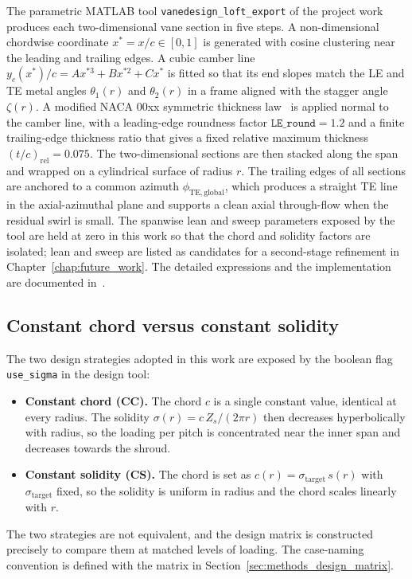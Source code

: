 The parametric MATLAB tool \texttt{vanedesign\_loft\_export} of the project work~\cite{Leonsen2025} produces each two-dimensional vane section in five steps. A non-dimensional chordwise coordinate $x^*=x/c\in[0,1]$ is generated with cosine clustering near the leading and trailing edges. A cubic camber line $y_c(x^*)/c = A x^{*3} + B x^{*2} + C x^*$ is fitted so that its end slopes match the LE and TE metal angles $\theta_1(r)$ and $\theta_2(r)$ in a frame aligned with the stagger angle $\zeta(r)$. A modified NACA 00xx symmetric thickness law~\cite{Abbott1959} is applied normal to the camber line, with a leading-edge roundness factor $\texttt{LE\_round}=1.2$ and a finite trailing-edge thickness ratio that gives a fixed relative maximum thickness $(t/c)_{\mathrm{rel}}=0.075$. The two-dimensional sections are then stacked along the span and wrapped on a cylindrical surface of radius $r$. The trailing edges of all sections are anchored to a common azimuth $\phi_{\mathrm{TE,global}}$, which produces a straight TE line in the axial-azimuthal plane and supports a clean axial through-flow when the residual swirl is small. The spanwise lean and sweep parameters exposed by the tool are held at zero in this work so that the chord and solidity factors are isolated; lean and sweep are listed as candidates for a second-stage refinement in Chapter~\ref{chap:future_work}. The detailed expressions and the implementation are documented in~\cite{Leonsen2025}.
 
\subsection{Constant chord versus constant solidity}
\label{sec:theory_const_chord_const_sol}
 
The two design strategies adopted in this work are exposed by the boolean flag \texttt{use\_sigma} in the design tool:
\begin{itemize}
  \item \textbf{Constant chord (CC).} The chord $c$ is a single constant value, identical at every radius. The solidity $\sigma(r) = c\,Z_s/(2\pi r)$ then decreases hyperbolically with radius, so the loading per pitch is concentrated near the inner span and decreases towards the shroud.
  \item \textbf{Constant solidity (CS).} The chord is set as $c(r) = \sigma_{\mathrm{target}}\,s(r)$ with $\sigma_{\mathrm{target}}$ fixed, so the solidity is uniform in radius and the chord scales linearly with $r$. 
\end{itemize}
The two strategies are not equivalent, and the design matrix is constructed precisely to compare them at matched levels of loading. The case-naming convention is defined with the matrix in Section~\ref{sec:methods_design_matrix}.



